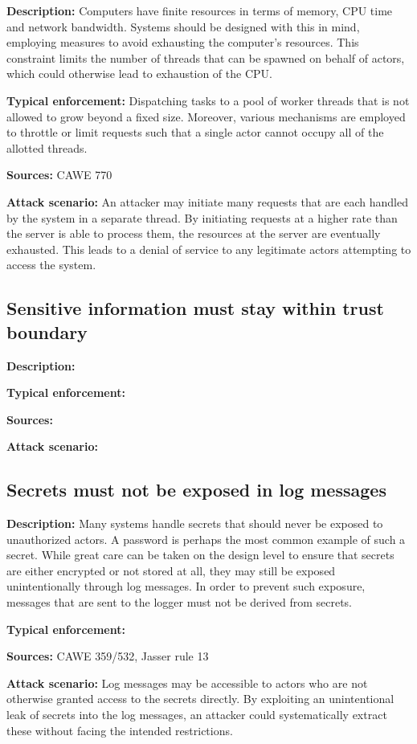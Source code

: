 \textbf{Description:} Computers have finite resources in terms of memory, CPU time and network bandwidth. Systems should be designed with this in mind, employing measures to avoid exhausting the computer's resources. This constraint limits the number of threads that can be spawned on behalf of actors, which could otherwise lead to exhaustion of the CPU.
 
 \textbf{Typical enforcement:} Dispatching tasks to a pool of worker threads that is not allowed to grow beyond a fixed size. Moreover, various mechanisms are employed to throttle or limit requests such that a single actor cannot occupy all of the allotted threads.
 
 \textbf{Sources:} CAWE 770
 
 \textbf{Attack scenario:} An attacker may initiate many requests that are each handled by the system in a separate thread. By initiating requests at a higher rate than the server is able to process them, the resources at the server are eventually exhausted. This leads to a denial of service to any legitimate actors attempting to access the system.

\subsection{Sensitive information must stay within trust boundary}

\textbf{Description:} 
 
 \textbf{Typical enforcement:}
 
 \textbf{Sources:}
 
 \textbf{Attack scenario:}

\subsection{Secrets must not be exposed in log messages}

\textbf{Description:} Many systems handle secrets that should never be exposed to unauthorized actors. A password is perhaps the most common example of such a secret. While great care can be taken on the design level to ensure that secrets are either encrypted or not stored at all, they may still be exposed unintentionally through log messages. In order to prevent such exposure, messages that are sent to the logger must not be derived from secrets.

 \textbf{Typical enforcement:} 
 
 \textbf{Sources:} CAWE 359/532, Jasser rule 13
 
 \textbf{Attack scenario:} Log messages may be accessible to actors who are not otherwise granted access to the secrets directly. By exploiting an unintentional leak of secrets into the log messages, an attacker could systematically extract these without facing the intended restrictions.